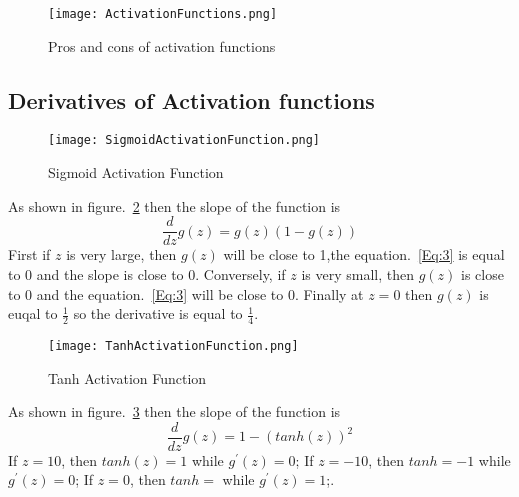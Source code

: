\documentclass[a4paper]{article}
\begin{document}
\begin{figure}[!htp]
\begin{center}
   \texttt{[image: ActivationFunctions.png]}
\end{center}
   \caption{Pros and cons of activation functions~\cite{mooc.com,Coursera.org}}
\label{fig:ActivationFunctions}
\end{figure}


\subsection{Derivatives of Activation functions}

\begin{figure}[!htp]
\begin{center}
   \texttt{[image: SigmoidActivationFunction.png]}
\end{center}
   \caption{Sigmoid Activation Function~\cite{mooc.com,Coursera.org}}
\label{fig:SigmoidActivationFunction}
\end{figure}

As shown in figure.~\ref{fig:SigmoidActivationFunction} then the slope of the function is 
\begin{equation}
\frac{d}{dz}g(z)=g(z)(1-g(z))
\label{Eq:3}
\end{equation}
First if $z$ is very large, then $g(z)$ will be close to 1,the equation.~\ref{Eq:3} is equal to 0 and the slope is close to 0. Conversely, if $z$ is very small, then $g(z)$ is close to 0  and the equation.~\ref{Eq:3} will be close to 0. Finally at $z=0$ then $g(z)$ is euqal to $\frac{1}{2}$ so the derivative is equal to $\frac{1}{4}$.\par

\begin{figure}[!htp]
\begin{center}
   \texttt{[image: TanhActivationFunction.png]}
\end{center}
   \caption{Tanh Activation Function~\cite{mooc.com,Coursera.org}}
\label{fig:TanhActivationFunction}
\end{figure}

As shown in figure.~\ref{fig:TanhActivationFunction} then the slope of the function is 
\begin{equation}
\frac{d}{dz}g(z)=1-(tanh(z))^2
\end{equation}
If $z=10$, then $tanh(z)=1$ while $g^{'}(z)=0$; If $z=-10$, then $tanh=-1$ while $g^{'}(z)=0$; If $z=0$, then $tanh=$ while $g^{'}(z)=1$;.
\end{document}
